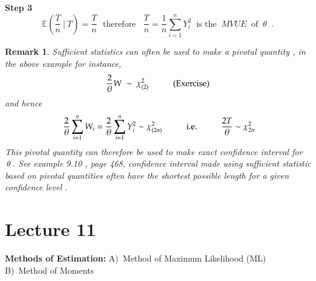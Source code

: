 \documentclass[14pt,twoside,a4paper,fleqn]{article}
\theoremstyle{plain}
\newtheorem*{remark*}{Remark}
\begin{document}
\tab\textbf{Step 3}
$$
	\mathbb{E}(\frac{T}{n}\ \big|\ T) = \frac{T}{n}\ \ \ \text{therefore} \ \ \ \ \frac{T}{n}=\frac{1}{n}\sum\limits_{i=1}^n Y_i^2\ \text{\ \ \ is the $\ MVUE\ $ of $\ \theta\ $ .}
$$
\begin{remark*}\emph{
Sufficient statistics can often be used to make a pivotal quantity , in the above example for instance,
$$
	\frac{2}{\theta} W\ \sim\ \chi^2_{(2)} \hspace*{1cm}\text{(Exercise)}
$$
and hence 
$$\ \frac{2}{\theta}\sum\limits_{i=1}^n W_i = \frac{2}{\theta}\sum\limits_{i=1}^n Y_i^2 \sim \chi^2_{(2n)}\tab\text{i.e.\tab} \frac{2T}{\theta}\sim\chi^2_{2n}$$
This pivotal quantity can therefore be used to make \emph{exact confidence interval} for $\ \theta\ $. See example 9.10 , page 468, confidence interval made using sufficient statistic based on pivotal quantities often have the shortest possible length for a given confidence level .
}\end{remark*}


\newpage
\section{Lecture 11}
\textbf{Methods of Estimation:}
\tab A)\ Method of Maximum Likelihood (ML)\\
\tab B)\ Method of Moments
\end{document}
